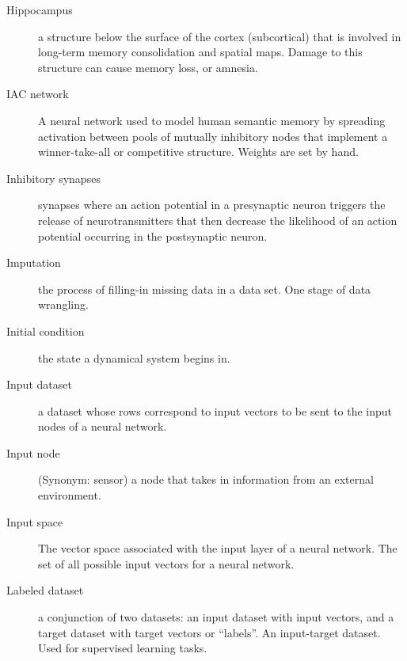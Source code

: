 \begin{description}
\item[Hippocampus] a structure below the surface of the cortex (subcortical) that is involved in long-term memory consolidation and spatial maps. Damage to this structure can cause memory loss, or amnesia. 


\item[IAC network] A neural network used to model human semantic memory by spreading activation between pools of mutually inhibitory nodes that implement a winner-take-all or competitive structure. Weights are set by hand. 

\item[Inhibitory synapses] synapses where an action potential in a presynaptic neuron triggers the release of neurotransmitters that then decrease the likelihood of an action potential occurring in the postsynaptic neuron.

\item[Imputation] the process of filling-in missing data in a data set. One stage of data wrangling.

\item[Initial condition] the state a dynamical system begins in.

\item[Input dataset] a dataset whose rows correspond to input vectors to be sent to the input nodes of a neural network.

\item[Input node] (Synonym: sensor) a node that takes in information from an external environment. 

\item[Input space] The vector space associated with the input layer of a neural network. The set of all possible input vectors for a neural network.





\item[Labeled dataset] a conjunction of two datasets: an input dataset with input vectors, and a target dataset with target vectors or ``labels''. An input-target dataset. Used for supervised learning tasks.  


\end{description}
